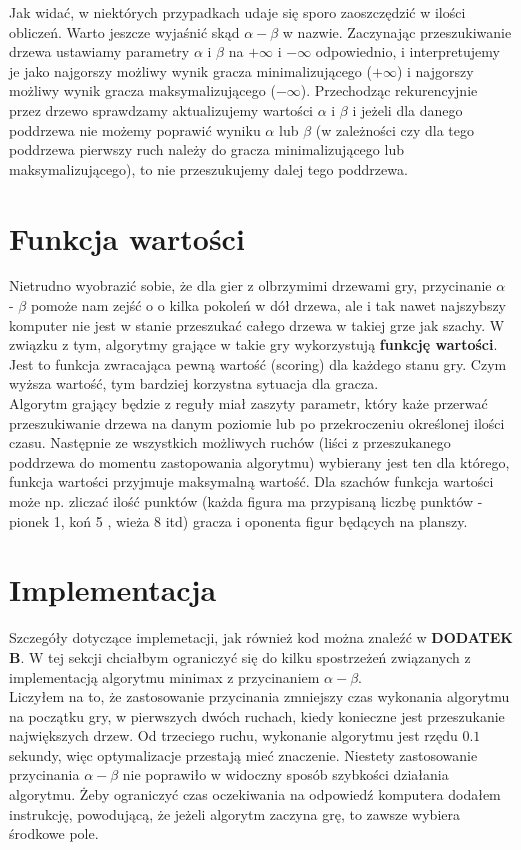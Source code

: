 \documentclass[licencjacka]{pracamgr}
\begin{document}
Jak widać, w niektórych przypadkach udaje się sporo zaoszczędzić w ilości obliczeń.  Warto jeszcze wyjaśnić skąd $\alpha - \beta$ w nazwie. Zaczynając przeszukiwanie drzewa ustawiamy parametry $\alpha$ i $\beta$ na $+\infty$ i $-\infty$ odpowiednio, i interpretujemy je jako najgorszy możliwy wynik gracza minimalizującego ($+\infty$) i  najgorszy możliwy wynik gracza maksymalizującego ($-\infty$). Przechodząc rekurencyjnie przez drzewo sprawdzamy aktualizujemy wartości $\alpha$ i $\beta$ i jeżeli dla danego poddrzewa  nie możemy poprawić wyniku  $\alpha$ lub  $\beta$ (w zależności czy dla tego poddrzewa pierwszy ruch należy do gracza minimalizującego lub maksymalizującego), to nie przeszukujemy dalej tego poddrzewa.


\section{Funkcja wartości}
Nietrudno wyobrazić sobie, że dla gier z olbrzymimi drzewami gry, przycinanie $\alpha$ - $\beta$ pomoże nam zejść o o kilka pokoleń w dół drzewa, ale i tak nawet najszybszy komputer nie jest w stanie przeszukać całego drzewa w takiej grze jak szachy. W związku z tym,  algorytmy grające w takie gry wykorzystują \textbf{funkcję wartości}. Jest to funkcja zwracająca pewną wartość (scoring) dla każdego stanu gry. Czym wyższa wartość, tym bardziej korzystna sytuacja dla gracza. \\

Algorytm grający będzie z reguły miał zaszyty parametr, który każe przerwać przeszukiwanie drzewa na danym poziomie lub po przekroczeniu określonej ilości czasu. Następnie ze wszystkich możliwych ruchów (liści z przeszukanego poddrzewa do momentu zastopowania algorytmu) wybierany jest ten dla którego, funkcja wartości przyjmuje maksymalną wartość. Dla szachów funkcja wartości może np. zliczać ilość punktów (każda figura ma przypisaną liczbę punktów - pionek 1, koń 5 , wieża 8 itd)  gracza i oponenta figur będących na planszy. 


\section{Implementacja}
Szczegóły dotyczące implemetacji, jak również kod można znaleźć w \textbf{DODATEK B}. W tej sekcji chciałbym ograniczyć się do kilku spostrzeżeń związanych z implementacją algorytmu minimax z przycinaniem $\alpha - \beta$.\\

Liczyłem na to, że zastosowanie przycinania zmniejszy czas wykonania algorytmu na początku gry, w pierwszych dwóch ruchach,  kiedy konieczne jest przeszukanie największych drzew. Od trzeciego ruchu, wykonanie algorytmu jest rzędu $0.1$ sekundy, więc optymalizacje przestają mieć znaczenie.  Niestety zastosowanie przycinania $\alpha - \beta$ nie poprawiło w widoczny sposób szybkości działania algorytmu. Żeby ograniczyć czas oczekiwania na odpowiedź komputera dodałem instrukcję, powodującą, że jeżeli algorytm zaczyna grę, to zawsze wybiera środkowe pole.\\
\end{document}
